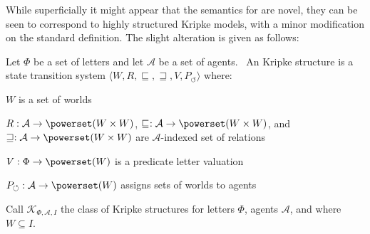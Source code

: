 % 
% 
% 

While superficially it might appear that the semantics for
 are novel, they can be seen to correspond to highly structured
Kripke models, with a minor modification on the standard definition.  The slight alteration is given as follows:

\begin{definition}
  Let $\Phi$ be a set of letters and let $\mathcal{A}$ be a set of agents. \
  An Kripke structure is a state transition system $\langle W, R,
  \sqsubseteq, \sqsupseteq, V,
  P_{\circlearrowleft} \rangle$ where:
  \begin{itemizedot}
    \item $W$ is a set of worlds
    
    \item $R : \mathcal{A} \rightarrow \powerset (W \times W)$,
    $\sqsubseteq^{} : \mathcal{A} \rightarrow \powerset (W \times W)$, and
    $\sqsupseteq : \mathcal{A} \rightarrow \powerset (W \times W)$ are
    $\mathcal{A}$-indexed set of relations
    
    \item $V : \Phi \rightarrow \powerset (W)$ is a predicate letter
    valuation
    
    \item $P_{\circlearrowleft} : \mathcal{A} \rightarrow \powerset (W)$
    assigns sets of worlds to agents
  \end{itemizedot}
  Call $\mathcal{K}_{\Phi, \mathcal{A}, I}$ the class of Kripke structures for
  letters $\Phi$, agents $\mathcal{A}$, and where $W \subseteq I$.
\end{definition}

